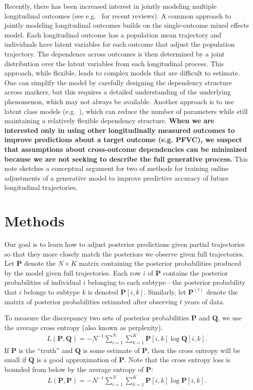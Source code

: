 \documentclass[12pt]{article}
\newcommand{\I}{{-1}}
\newcommand{\psup}[1]{^{(#1)}}
\begin{document}
Recently, there has been increased interest in jointly modeling multiple longitudinal outcomes (see e.g.~\cite{Verbeke2014-cs,Fieuws2007-qo} for recent reviews). A common approach to jointly modeling longitudinal outcomes builds on the single-outcome mixed effects model. Each longitudinal outcome has a population mean trajectory and individuals have latent variables for each outcome that adjust the population trajectory. The dependence across outcomes is then determined by a joint distribution over the latent variables from each longitudinal process. This approach, while flexible, leads to complex models that are difficult to estimate. One can simplify the model by carefully designing the dependency structure across markers, but this requires a detailed understanding of the underlying phenomenon, which may not always be available. Another approach is to use latent class models (e.g.~\cite{Putter2008-gx}), which can reduce the number of parameters while still maintaining a relatively flexible dependency structure. \textbf{When we are interested only in using other longitudinally measured outcomes to improve predictions about a target outcome (e.g. PFVC), we suspect that assumptions about cross-outcome dependencies can be minimized because we are not seeking to describe the full generative process.} This note sketches a conceptual argument for two of methods for training online adjustments of a generative model to improve predictive accuracy of future longitudinal trajectories. 

\section{Methods}

Our goal is to learn how to adjust posterior predictions given partial trajectories so that they more closely match the posteriors we observe given full trajectories. Let $\bm{P}$ denote the $N \times K$ matrix containing the posterior probabilities produced by the model given full trajectories. Each row $i$ of $\bm{P}$ contains the posterior probabilities of individual $i$ belonging to each subtype---the posterior probability that $i$ belongs to subtype $k$ is denoted $\bm{P}[i,k]$. Similarly, let $\bm{P}\psup{t}$ denote the matrix of posterior probabilities estimated after observing $t$ years of data.

To measure the discrepancy two sets of posterior probabilities $\bm{P}$ and $\bm{Q}$, we use the average cross entropy (also known as perplexity).
\begin{align}
L(\bm{P}, \bm{Q}) = - N^\I \sum_{i=1}^N \sum_{k=1}^K \bm{P}[i,k] \log \bm{Q}[i,k].
\end{align}
If $\bm{P}$ is the ``truth'' and $\bm{Q}$ is some estimate of $\bm{P}$, then the cross entropy will be small if $\bm{Q}$ is a good approximation of $\bm{P}$. Note that the cross entropy loss is bounded from below by the average entropy of $\bm{P}$:
\begin{align}
L(\bm{P}, \bm{P}) = - N^\I \sum_{i=1}^N \sum_{k=1}^K \bm{P}[i,k] \log \bm{P}[i,k].
\end{align}
\end{document}
